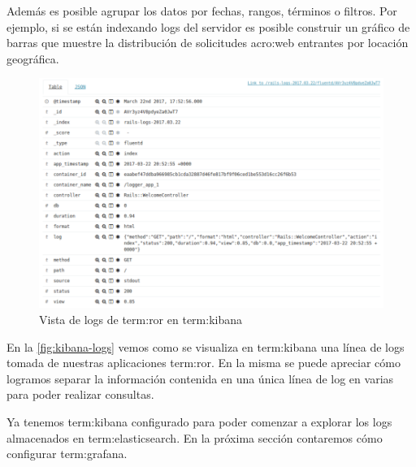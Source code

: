 Además es posible agrupar los datos por fechas, rangos, términos o filtros. Por
ejemplo, si se están indexando logs del servidor es posible construir un
gráfico de barras que muestre la distribución de solicitudes \gls{acro:web}
entrantes por locación geográfica.

\begin{figure}
  \includegraphics[width=\linewidth]{src/images/05-capitulo-5/kibana-logs.png}
  \caption{Vista de logs de \gls{term:ror} en \gls{term:kibana}}
  \label{fig:kibana-logs}
\end{figure}

En la \autoref{fig:kibana-logs} vemos como se visualiza en \gls{term:kibana}
una línea de logs tomada de nuestras aplicaciones \gls{term:ror}. En la misma
se puede apreciar cómo logramos separar la información contenida en una única
línea de log en varias para poder realizar consultas.

Ya tenemos \gls{term:kibana} configurado para poder comenzar a explorar los
logs almacenados en \gls{term:elasticsearch}. En la próxima sección contaremos
cómo configurar \gls{term:grafana}.
